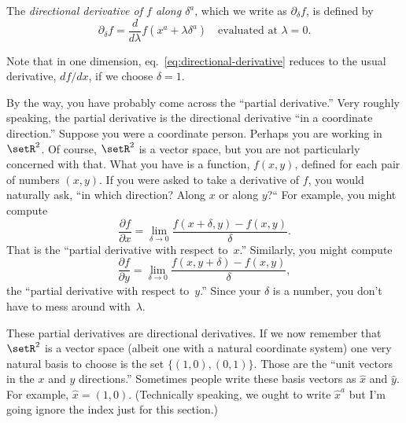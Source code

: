 \documentclass[10pt, a4paper]{article}
\begin{document}
The \emph{directional derivative of $f$ along $\delta^a$}, which we write
as $\partial_\delta f$, is defined by
\begin{equation}
\partial_\delta f = \frac{d}{d\lambda} f(x^a+\lambda\delta^a) \quad\text{evaluated at $\lambda = 0$}.
  \label{eq:directional-derivative}
\end{equation}

Note that in one dimension, eq.~\ref{eq:directional-derivative}
reduces to the usual derivative, $df/dx$, if we choose
$\delta=1$.










By the way, you have probably come across the “partial derivative.”
Very roughly speaking, the partial derivative is the directional
derivative “in a coordinate direction.” Suppose you were a coordinate
person. Perhaps you are working in $\setR^2$. Of course, $\setR^2$ is
a vector space, but you are not particularly concerned with that. What
you have is a function, $f(x,y)$, defined for each pair of numbers
$(x,y)$. If you were asked to take a derivative of $f$, you would
naturally ask, “in which direction? Along $x$ or along $y$?“ For
example, you might compute
\begin{equation*}
  \frac{\partial f}{\partial x} = \lim_{\delta\to 0} \frac{f(x + \delta, y) - f(x, y)}{\delta}.
\end{equation*}
That is the “partial derivative with respect to~$x$.” Similarly, you
might compute
\begin{equation*}
  \frac{\partial f}{\partial y} = \lim_{\delta\to 0} \frac{f(x, y+\delta) - f(x, y)}{\delta},
\end{equation*}
the “partial derivative with respect to~$y$.” Since your $\delta$ is a
number, you don't have to mess around with~$\lambda$.

These partial derivatives are directional derivatives. If we now
remember that $\setR^2$ is a vector space (albeit one with a natural
coordinate system) one very natural basis to choose is the set
$\{(1,0), (0,1)\}$. Those are the “unit vectors in the $x$ and $y$
directions.” Sometimes people write these basis vectors as $\hat{x}$
and $\hat{y}$. For example, $\hat{x} = (1,0)$. (Technically speaking,
we ought to write $\hat{x}^a$ but I'm going ignore the index just for
this section.)
\end{document}
